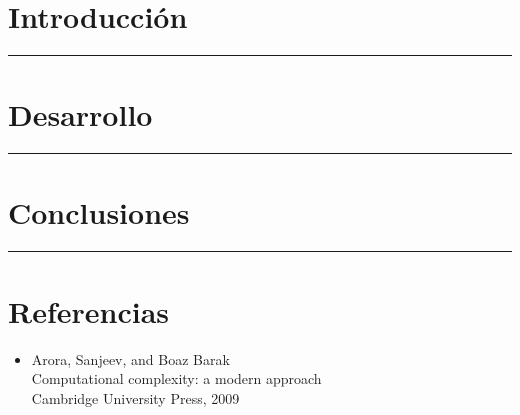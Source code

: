 \documentclass[12pt,letterpaper]{article}
\newcommand{\lineaxd}{{\color{brown}\rule{\linewidth}{0.5mm}}}
\begin{document}
\section*{Introducción}

\lineaxd
\section*{Desarrollo}

\lineaxd
\section*{Conclusiones}

\lineaxd


\section*{Referencias}
\begin{itemize}
    \item Arora, Sanjeev, and Boaz Barak\\
    Computational complexity: a modern approach\\
    Cambridge University Press, 2009
    
    \url{}    
    
\end{itemize}
\end{document}
